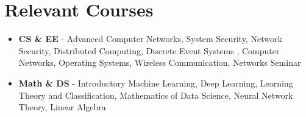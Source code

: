 \section{Relevant Courses}
\begin{itemize}
\item \textbf{CS \& EE} - Advanced Computer Networks, System Security, Network Security, Distributed Computing, Discrete Event Systems , Computer Networks, Operating Systems, Wireless Communication, Networks Seminar
\item \textbf{Math \& DS} - Introductory Machine Learning, Deep Learning, Learning Theory and Classification, Mathematics of Data Science, Neural Network Theory, Linear Algebra
\end{itemize}